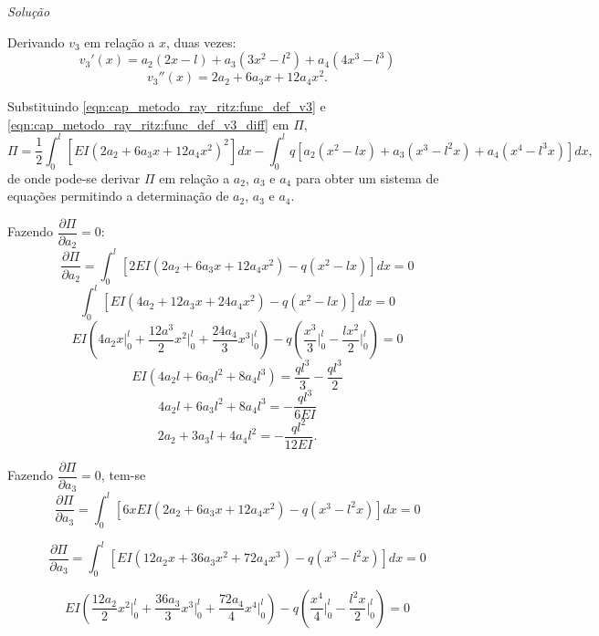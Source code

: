 \documentclass[
	12pt,				%
	openright,			%
    twoside,			%
	a4paper,			%
	english,			%
	french,				%
	spanish,			%
	brazil				%
	]{abntex2}
\makeatletter
\renewenvironment{proof}[1][\proofname]{
	\par\pushQED{\qed}%
	\normalfont \topsep6\p@\@plus6\p@\relax
	\trivlist
	\item\relax
		{\itshape
			#1\@addpunct{.}}\hspace\labelsep\ignorespaces
}{%
	\popQED\endtrivlist\@endpefalse
}
\newenvironment{solution}{
	\begin{proof}[Solução]
}{%
	\end{proof}
}
\numberwithin{lema}{chapter}
\numberwithin{teorema}{chapter}
\numberwithin{definicao}{chapter}
\numberwithin{exemplo}{chapter}
\numberwithin{figure}{chapter}
\makeatother
\begin{document}
\begin{solution}
	Derivando $v_3$ em relação a $x$, duas vezes:
	$$
		v_3'(x)=
		a_2(2x - l)
		+
		a_3(3x^2 - l^2)
		+
		a_4(4x^3 - l^3)
	$$
	\begin{equation}
		\label{eqn:cap_metodo_ray_ritz:func_def_v3_diff}
		v_3''(x)=
		2a_2
		+
		6a_3 x
		+
		12a_4 x^2
		\text{.}
	\end{equation}
	
	Substituindo \eqref{eqn:cap_metodo_ray_ritz:func_def_v3} e \eqref{eqn:cap_metodo_ray_ritz:func_def_v3_diff} em $\Pi$,
	$$
		\Pi = \frac{1}{2} \int_0^l \left [
			EI(2a_2+6a_3x+12a_4x^2)^2
		\right ] dx
		-
		\int_0^l q \left [
			a_2(x^2 - lx)
			+
			a_3(x^3 - l^2x)
			+
			a_4(x^4 - l^3x)
		\right ] dx
		\text{,}
	$$
	de onde pode-se derivar $\Pi$ em relação a $a_2$, $a_3$ e $a_4$ para obter um sistema de equações permitindo a determinação de $a_2$, $a_3$ e $a_4$.
	
	Fazendo $\dfrac{\partial \Pi}{\partial a_2} = 0$:
	\begin{equation}
		\label{eqn:cap_metodo_ray_ritz:exemp_v3_diff_a2}
		\frac{\partial \Pi}{\partial a_2}
		=
		\int_0^l \left [
			2EI(2a_2 + 6a_3x + 12a_4x^2)
			-
			q(x^2 - lx)
		\right ] dx
		= 0
	\end{equation}
	$$
		\int_0^l \left [
			EI(4a_2 + 12a_3x + 24a_4x^2)
			-
			q(x^2 - lx)
		\right ] dx
		= 0
	$$
	$$
		EI \left (
			4a_2 x \Big |_0^l
			+
			\frac{12a^3}{2}x^2 \Big |_0^l
			+
			\frac{24a_4}{3}x^3 \Big |_0^l
		\right )
		- q
		\left (
			\frac{x^3}{3} \Big |_0^l
			-
			\frac{lx^2}{2} \Big |_0^l
		\right )
		= 0
	$$
	$$
		EI(4a_2l + 6a_3l^2 + 8a_4l^3)
		=
		\frac{ql^3}{3}
		-
		\frac{ql^3}{2}
	$$
	$$
		4a_2l + 6a_3l^2 + 8a_4l^3 = -\frac{ql^3}{6EI}
	$$
	\begin{equation}
		\label{eq:exemp_rayritz_approx3_eq1}
		2a_2 + 3a_3l + 4a_4l^2 = -\frac{ql^2}{12EI}
		\text{.}
	\end{equation}
		
	Fazendo $\dfrac{\partial \Pi}{\partial a_3} = 0$, tem-se
	\begin{equation}
		\label{eqn:cap_metodo_ray_ritz:exemp_v3_diff_a3}
		\frac{\partial \Pi}{\partial a_3}
		=
		\int_0^l \left [
			6xEI(2a_2 + 6a_3x + 12a_4x^2)
			-
			q(x^3 - l^2x)
		\right ] dx
		= 0
	\end{equation}
	
	$$
		\frac{\partial \Pi}{\partial a_3}
		=
		\int_0^l \left [
			EI(12 a_2 x + 36 a_3 x^2 + 72 a_4 x^3)
			-
			q(x^3-l^2x)
		\right ] dx
		= 0
	$$
	
	$$
		EI \left (
			\frac{12a_2}{2} x^2 \Big |_0^l
			+
			\frac{36a_3}{3} x^3 \Big |_0^l
			+
			\frac{72a_4}{4} x^4 \Big |_0^l
		\right )
		-
		q \left (
			\frac{x^4}{4} \Big |_0^l
			-
			\frac{l^2 x}{2} \Big |_0^l
		\right )
		= 0
	$$
	

\end{solution}
\end{document}
